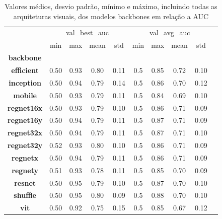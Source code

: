 \begin{table}
\centering
\caption{Valores médios, desvio padrão, mínimo e máximo, incluindo todas as arquiteturas visuais, dos modelos backbones em relação a AUC}
\label{tab:aucbackbone}
\begin{tabular}{c|c|c|c|c|c|c|c|c|c}
\toprule
{} & \multicolumn{4}{c|}{val\_best\_auc} & \multicolumn{4}{c|}{val\_avg\_auc} \\
{} &          min &   max &  mean &   std &         min &   max &  mean &   std \\
\textbf{backbone } &              &       &       &       &             &       &       &       \\
\midrule
\textbf{efficient} &         0.50 &  0.93 &  0.80 &  0.11 &         0.5 &  0.85 &  0.72 &  0.10 \\
\textbf{inception} &         0.50 &  0.94 &  0.79 &  0.14 &         0.5 &  0.86 &  0.70 &  0.12 \\
\textbf{mobile   } &         0.50 &  0.93 &  0.79 &  0.11 &         0.5 &  0.84 &  0.69 &  0.10 \\
\textbf{regnet16x} &         0.50 &  0.93 &  0.79 &  0.10 &         0.5 &  0.86 &  0.71 &  0.09 \\
\textbf{regnet16y} &         0.50 &  0.94 &  0.79 &  0.11 &         0.5 &  0.87 &  0.71 &  0.09 \\
\textbf{regnet32x} &         0.50 &  0.94 &  0.79 &  0.11 &         0.5 &  0.87 &  0.71 &  0.10 \\
\textbf{regnet32y} &         0.52 &  0.93 &  0.80 &  0.10 &         0.5 &  0.86 &  0.71 &  0.09 \\
\textbf{regnetx  } &         0.50 &  0.94 &  0.79 &  0.11 &         0.5 &  0.86 &  0.71 &  0.09 \\
\textbf{regnety  } &         0.51 &  0.93 &  0.78 &  0.11 &         0.5 &  0.85 &  0.70 &  0.09 \\
\textbf{resnet   } &         0.50 &  0.95 &  0.79 &  0.10 &         0.5 &  0.87 &  0.70 &  0.10 \\
\textbf{shuffle  } &         0.50 &  0.95 &  0.80 &  0.09 &         0.5 &  0.88 &  0.70 &  0.10 \\
\textbf{vit      } &         0.50 &  0.92 &  0.75 &  0.15 &         0.5 &  0.85 &  0.67 &  0.12 \\
\bottomrule
\end{tabular}
\end{table}
